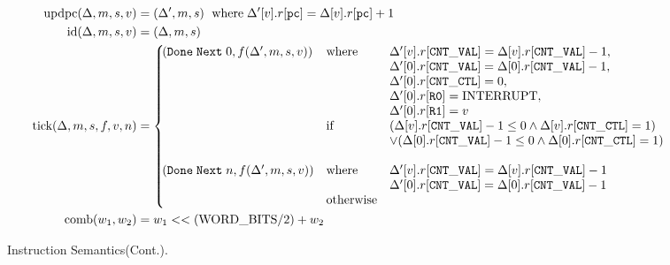 \documentclass[a4paper]{article}
\newcommand*{\PWBITS}{\text{WORD\_BITS}}
\newcommand*{\updpc}{\text{updpc}}
\begin{document}
\begin{figure}[!h]
  \begin{align*}
    \updpc(\Delta,m,s,v)&=(\Delta',m,s)\ \; \text{where}\; \Delta'[v].r[\mathtt{pc}] = \Delta[v].r[\mathtt{pc}]+1\\
    \text{id}(\Delta,m,s,v)& = (\Delta,m,s)\\
    \nextt(\Delta,m,s,f,v,n)&= \left\{\!\!\!\!\begin{array}{lll}
                                \DNXT{0}{f(\Delta',m,s,v)} &\text{where }&\Delta'[v].r[\mathtt{CNT\_VAL}] = \Delta[v].r[\mathtt{CNT\_VAL}] -1,\\
                                & & \Delta'[0].r[\mathtt{CNT\_VAL}] = \Delta[0].r[\mathtt{CNT\_VAL}] -1,\\
                                & &\Delta'[0].r[\mathtt{CNT\_CTL}] = 0,\\
                                & &\Delta'[0].r[\mathtt{R0}]=\toword{INTERRUPT},\\
                                & &\Delta'[0].r[\mathtt{R1}] = v\\
                                & \text{if}&(\Delta[v].r[\mathtt{CNT\_VAL}] -1 \le 0 \land\Delta[v].r[\mathtt{CNT\_CTL}] = 1)\\
                                & &\lor(\Delta[0].r[\mathtt{CNT\_VAL}] -1 \le 0\land\Delta[0].r[\mathtt{CNT\_CTL}] = 1)\\
                                \\
                                \DNXT{n}{f(\Delta',m,s,v)} &\text{where}&\Delta'[v].r[\mathtt{CNT\_VAL}] = \Delta[v].r[\mathtt{CNT\_VAL}] -1\\
                                & &\Delta'[0].r[\mathtt{CNT\_VAL}] = \Delta[0].r[\mathtt{CNT\_VAL}] -1\\
                                & \text{otherwise}\\
                                              \end{array}  \right.\\
    \text{comb}(w_{1},w_{2})&=w_{1}<<(\PWBITS/2)+w_{2}
  \end{align*}
  \caption{Instruction Semantics(Cont.).}
\end{figure}
\end{document}
